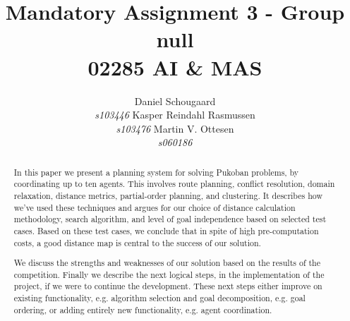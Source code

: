 \documentclass[letterpaper]{article}
\begin{document}
\title{Mandatory Assignment 3 - Group null\\ 02285 AI \& MAS}
\author{Daniel Schougaard \\ \textit{s103446} \And Kasper Reindahl Rasmussen\\ \textit{s103476} \And Martin V. Ottesen\\ \textit{s060186}}
\maketitle

\begin{abstract}
In this paper we present a planning system for solving Pukoban problems, by coordinating up to ten agents. This involves route planning, conflict resolution, domain relaxation, distance metrics, partial-order planning, and clustering. It describes how we've used these techniques and argues for our choice of distance calculation methodology, search algorithm, and level of goal independence based on selected test cases. Based on these test cases, we conclude that in spite of high pre-computation costs, a good distance map is central to the success of our solution. 

We discuss the strengths and weaknesses of our solution based on the results of the competition. Finally we describe the next logical steps, in the implementation of the project, if we were to continue the development. These next steps either improve on existing functionality, e.g. algorithm selection and goal decomposition, e.g. goal ordering, or adding entirely new functionality, e.g. agent coordination.

\end{abstract}
\end{document}
